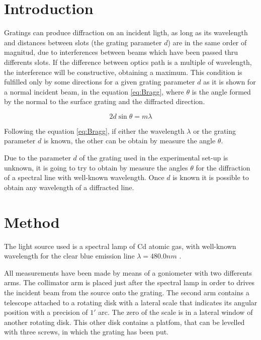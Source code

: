\documentclass[twoside]{article}
\begin{document}
	\begin{multicols}{2} %

		\section{Introduction} %

			Gratings can produce diffraction on an incident ligth, as long as its wavelength and distances between slots (the grating parameter $d$) are in the same order of magnitud, due to interferences between beams which have been passed thru differents slots. If the difference between optics path is a multiple of wavelength, the interference will be constructive, obtaining a maximum. This condition is fulfilled only by some directions for a given grating parameter $d$ as it is shown for a normal incident beam, in the equation \ref{eq:Bragg}, where $\theta$ is the angle formed by the normal to the surface grating and the diffracted direction. 

				\begin{equation}
					2 d \sin \theta = m \lambda
					\label{eq:Bragg}
				\end{equation}

			Following the equation \ref{eq:Bragg}, if either the wavelength $\lambda$ or the grating parameter $d$ is known, the other can be obtain by measure the angle $\theta$.

			Due to the parameter $d$ of the grating used in the experimental set-up is unknown, it is going to try to obtain by measure the angles $\theta$ for the diffraction of a spectral line with well-known wavelength. Once $d$ is known it is possible to obtain any wavelength of a diffracted line. 


		\section{Method}

			The light source used is a spectral lamp of Cd atomic gas, with well-known wavelength for the clear blue emission line $\lambda = 480.0 nm$ \cite{Chema}.

			All measurements have been made by means of a goniometer with two differents arms. The collimator arm is placed just after the spectral lamp in order to drives the incident beam from the source onto the grating. The second arm contains a telescope attached to a rotating disk with a lateral scale that indicates its angular position with a precision of $1'$ arc. The zero of the scale is in a lateral window of another rotating disk. This other disk contains a platfom, that can be levelled with three screws, in which the grating has been put. 


\end{multicols}
\end{document}
